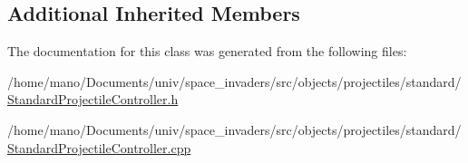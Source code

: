 \subsection*{Additional Inherited Members}


The documentation for this class was generated from the following files\+:\begin{DoxyCompactItemize}
\item 
/home/mano/\+Documents/univ/space\+\_\+invaders/src/objects/projectiles/standard/\hyperlink{StandardProjectileController_8h}{Standard\+Projectile\+Controller.\+h}\item
/home/mano/\+Documents/univ/space\+\_\+invaders/src/objects/projectiles/standard/\hyperlink{StandardProjectileController_8cpp}{Standard\+Projectile\+Controller.\+cpp}\end{DoxyCompactItemize}
